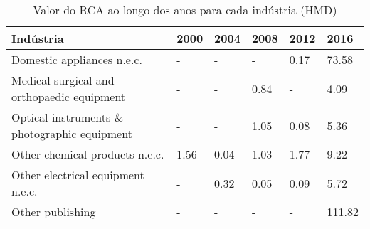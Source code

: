 \begin{table}
\centering
\caption{Valor do RCA ao longo dos anos para cada indústria (HMD)}
\label{tab:ex3-tempo-HMD}
\begin{tabular}{p{6cm}p{1.5cm}p{1.5cm}p{1.5cm}p{1.5cm}p{1.5cm}}
\toprule
                                   Indústria & 2000 & 2004 & 2008 & 2012 &   2016 \\
\midrule
                  Domestic appliances n.e.c. &    - &    - &    - & 0.17 &  73.58 \\
  Medical surgical and orthopaedic equipment &    - &    - & 0.84 &    - &   4.09 \\
Optical instruments \& photographic equipment &    - &    - & 1.05 & 0.08 &   5.36 \\
              Other chemical products n.e.c. & 1.56 & 0.04 & 1.03 & 1.77 &   9.22 \\
           Other electrical equipment n.e.c. &    - & 0.32 & 0.05 & 0.09 &   5.72 \\
                            Other publishing &    - &    - &    - &    - & 111.82 \\
\bottomrule
\end{tabular}
\end{table}
